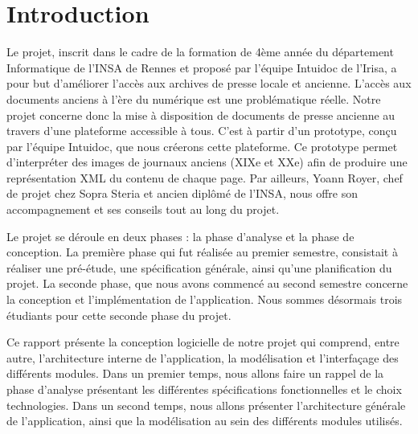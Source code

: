 \section{Introduction}
\label{sec:intro}

Le projet, inscrit dans le cadre de la formation de 4ème année du département Informatique de l’INSA de Rennes et proposé par l’équipe Intuidoc de l’Irisa, a pour but d’améliorer l’accès aux archives de presse locale et ancienne. L’accès aux documents anciens à l’ère du numérique est une problématique réelle. Notre projet concerne donc la mise à disposition de documents de presse ancienne au travers d’une plateforme accessible à tous. C’est à partir d’un prototype, conçu par l’équipe Intuidoc, que nous créerons cette plateforme.
Ce prototype permet d’interpréter des images de journaux anciens (XIXe et XXe) afin de produire une représentation XML du contenu de chaque page. Par ailleurs, Yoann Royer, chef de projet chez Sopra Steria et ancien diplômé de l’INSA, nous offre son accompagnement et ses conseils tout au long du projet.

Le projet se déroule en deux phases : la phase d'analyse et la phase de conception. La première phase qui fut réalisée au premier semestre, consistait à réaliser une pré-étude, une spécification générale, ainsi qu'une planification  du projet. La seconde phase, que nous avons commencé au second semestre concerne la conception et l'implémentation de l'application. Nous sommes désormais trois étudiants pour cette seconde phase du projet.

Ce rapport présente la conception logicielle de notre projet qui comprend, entre autre, l'architecture interne de l'application, la modélisation et l'interfaçage des différents modules. Dans un premier temps, nous allons faire un rappel de la phase d'analyse présentant les différentes spécifications fonctionnelles et le choix technologies. Dans un second temps, nous allons présenter l'architecture générale de l'application, ainsi que la modélisation au sein des différents modules utilisés.

